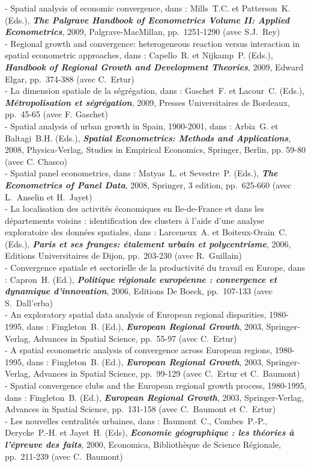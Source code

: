 \documentclass[a4paper,12pt]{article}
\begin{document}
- Spatial analysis of economic convergence, dans : Mills~T.C. et Patterson~K. (Eds.), \textit{\textbf{The Palgrave Handbook of Econometrics Volume II: Applied Econometrics}}, 2009, Palgrave-MacMillan, pp.~1251-1290 (avec S.J.~Rey) \\
- Regional growth and convergence: heterogeneous reaction versus interaction in spatial econometric approaches, dans : Capello~R. et Nijkamp~P. (Eds.), \textit{\textbf{Handbook of Regional Growth and Development Theories}}, 2009, Edward Elgar, pp.~374-388 (avec C.~Ertur) \\
- La dimension spatiale de la ségrégation, dans : Gaschet~F. et Lacour~C. (Eds.), \textit{\textbf{Métropolisation et ségrégation}}, 2009, Presses Universitaires de Bordeaux, pp.~45-65 (avec F. Gaschet) \\
- Spatial analysis of urban growth in Spain, 1900-2001, dans : Arbia~G. et Baltagi~B.H. (Eds.), \textit{\textbf{Spatial Econometrics: Methods and Applications}}, 2008, Physica-Verlag, Studies in Empirical Economics, Springer, Berlin, pp. 59-80 (avec C. Chasco) \\
- Spatial panel econometrics, dans : Matyas~L. et Sevestre~P. (Eds.), \textit{\textbf{The Econometrics of Panel Data}}, 2008, Springer, 3\ieme{} edition, pp.~625-660 (avec L.~Anselin et H.~Jayet) \\
- La localisation des activités économiques en Ile-de-France et dans les départements voisins : identification des clusters à l'aide d'une analyse exploratoire des données spatiales, dans : Larceneux~A. et Boiteux-Orain~C. (Eds.), \textit{\textbf{Paris et ses franges: étalement urbain et polycentrisme}}, 2006, Editions Universitaires de Dijon, pp.~203-230 (avec R.~Guillain) \\
- Convergence spatiale et sectorielle de la productivité du travail en Europe, dans : Capron~H. (Ed.), \textit{\textbf{Politique régionale européenne : convergence et dynamique d'innovation}}, 2006, Editions De Boeck, pp.~107-133 (avec S.~Dall'erba) \\
- An exploratory spatial data analysis of European regional disparities, 1980-1995, dans : Fingleton~B. (Ed.), \textit{\textbf{European Regional Growth}}, 2003, Springer-Verlag, Advances in Spatial Science, pp.~55-97 (avec C.~Ertur) \\
- A spatial econometric analysis of convergence across European regions, 1980-1995, dans : Fingleton~B. (Ed.), \textit{\textbf{European Regional Growth}}, 2003, Springer-Verlag, Advances in Spatial Science, pp.~99-129 (avec C.~Ertur et C.~Baumont) \\
- Spatial convergence clubs and the European regional growth process, 1980-1995, dans : Fingleton~B. (Ed.), \textit{\textbf{European Regional Growth}}, 2003, Springer-Verlag, Advances in Spatial Science, pp.~131-158 (avec C.~Baumont et C.~Ertur) \\
- Les nouvelles centralités urbaines, dans : Baumont~C., Combes~P.-P., Derycke~P.-H. et Jayet~H. (Eds), \textit{\textbf{Economie géographique : les théories à l'épreuve des faits}}, 2000, Economica, Bibliothèque de Science Régionale, pp.~211-239 (avec C.~Baumont) \\
\end{document}
